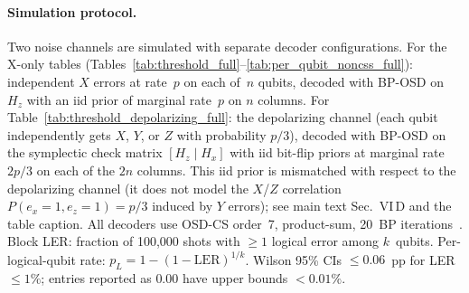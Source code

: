 \documentclass[aps,prxquantum,twocolumn,superscriptaddress,nofootinbib]{revtex4-2}
\begin{document}
\paragraph{Simulation protocol.}
Two noise channels are simulated with separate decoder configurations.
For the X-only tables (Tables~\ref{tab:threshold_full}--\ref{tab:per_qubit_noncss_full}): independent $X$ errors at rate~$p$ on each of~$n$ qubits, decoded with BP-OSD on $H_z$ with an iid prior of marginal rate~$p$ on $n$ columns.
For Table~\ref{tab:threshold_depolarizing_full}: the depolarizing channel (each qubit independently gets $X$, $Y$, or $Z$ with probability $p/3$), decoded with BP-OSD on the symplectic check matrix $[H_z \mid H_x]$ with iid bit-flip priors at marginal rate $2p/3$ on each of the $2n$ columns.
This iid prior is mismatched with respect to the depolarizing channel (it does not model the $X$/$Z$ correlation $P(e_x{=}1, e_z{=}1) = p/3$ induced by $Y$ errors); see main text Sec.~VI\,D and the table caption.
All decoders use OSD-CS order~7, product-sum, 20~BP iterations~\cite{panteleev2021degenerate,roffe2020decoding}.
Block LER: fraction of 100{,}000 shots with $\geq 1$ logical error among $k$~qubits.
Per-logical-qubit rate: $p_L = 1 - (1 - \text{LER})^{1/k}$.
Wilson 95\% CIs $\leq 0.06$~pp for LER~$\leq 1\%$; entries reported as $0.00$ have upper bounds $< 0.01\%$.
\end{document}
